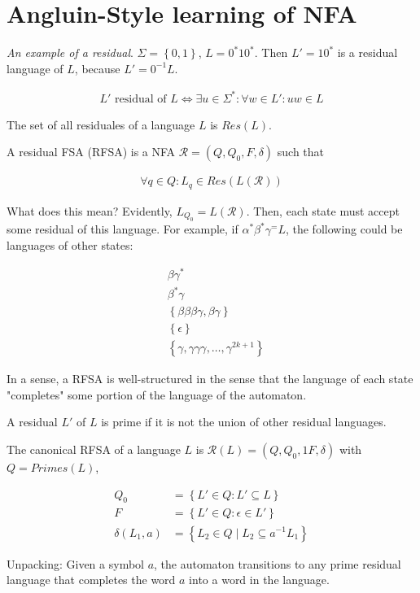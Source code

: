 \documentclass[a4paper, 12pt]{article}
\begin{document}
\section{Angluin-Style learning of NFA}


\textit{An example of a residual}. $\Sigma = \left\{ 0, 1 \right\} $, $L =  0^*1 0^* $. Then 
$L' = 10^* $ is a residual language of $L$,
because $L' = 0^{-1} L$.

\begin{align*}
    L' \text{ residual of } L \iff \exists u \in \Sigma^{*} : \forall w \in L' : uw \in L
\end{align*}

The set of all residuales of a language $L$ is $Res(L)$. 

A residual FSA (RFSA) is a NFA $\mathcal{R} = \left( Q, Q_0, F, \delta \right) $ 
such that 

\begin{align*}
    \forall q \in Q : L_{q} \in Res \left( L \left( \mathcal{R} \right)  \right) 
\end{align*}

What does this mean? Evidently, $L_{Q_0} = L(\mathcal{R})$. Then, each state must accept 
some residual of this language. For example, if $\alpha^*\beta^*\gamma^ = L$, the 
following could be languages of other states:

\begin{align*}
    &\beta \gamma^* \\ 
    &\beta^* \gamma \\ 
    &\left\{ \beta \beta \beta \gamma, \beta \gamma \right\}  \\ 
    &\left\{ \epsilon \right\} \\
    &\left\{ \gamma, \gamma\gamma\gamma, \ldots, \gamma^{2k + 1} \right\} 
\end{align*}

In a sense, a RFSA is well-structured in the sense that the language of each 
state "completes" some portion of the language of the automaton.

A residual $L'$ of $L$ is prime if it is not the union of other residual languages.

The canonical RFSA of a language $L$ is $\mathcal{R}(L) = (Q, Q_{0},1 F, \delta)$ with $Q = Primes(L)$,

\begin{align*}
    Q_0 &= \left\{ L' \in Q : L' \subseteq L \right\}  \\ 
    F &= \left\{ L' \in Q : \epsilon \in L' \right\}  \\ 
    \delta(L_1, a) &= \left\{ L_2 \in Q \mid L_2 \subseteq a^{-1} L_1 \right\} 
\end{align*}

Unpacking: Given a symbol $a$, the automaton transitions to any prime 
residual language that completes the word $a$ into a word in the language.
\end{document}
